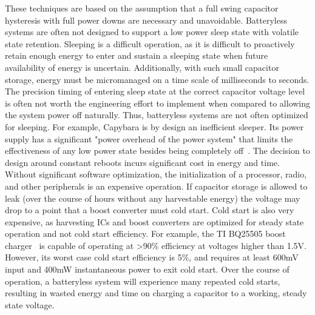 These techniques are based on the assumption that a full swing capacitor hysteresis with full power downs are necessary and unavoidable. Batteryless systems are often not designed to support a low power sleep state with volatile state retention.
Sleeping is a difficult operation, as it is difficult to proactively retain enough energy to enter and sustain a sleeping state when future availability of energy is uncertain.
Additionally, with such small capacitor storage, energy must be micromanaged on a time scale of milliseconds to seconds.
The precision timing of entering sleep state at the correct capacitor voltage level is often not worth the engineering effort to implement when compared to allowing the system power off naturally. Thus, batteryless systems are not often optimized for sleeping.
For example, Capybara is by design an inefficient sleeper. Its power supply has a significant
"power overhead of the power system" that limits the effectiveness of
any low power state besides being completely off~\cite{colinReconfigurable18}.
The decision to design around constant reboots incurs significant cost in energy and time. Without significant software optimization, the initialization of a processor, radio, and other peripherals is an expensive operation. If capacitor storage is allowed to leak (over the course of hours without any harvestable energy) the voltage may drop to a point that a boost converter must cold start.
Cold start is also very expensive, as harvesting ICs and boost converters are optimized for steady state operation and not cold start efficiency.
For example, the TI BQ25505 boost charger~\cite{bq25505} is capable of operating at \textgreater90\% efficiency at voltages higher than 1.5\si{\volt}.
However, its worst case cold start efficiency is 5\%, and requires at least 600\si{\milli\volt} input and 400\si{\milli\watt} instantaneous power to exit cold start.
Over the course of operation, a batteryless system will experience many repeated cold starts, resulting in wasted energy and time on charging a capacitor to a working, steady state voltage.


